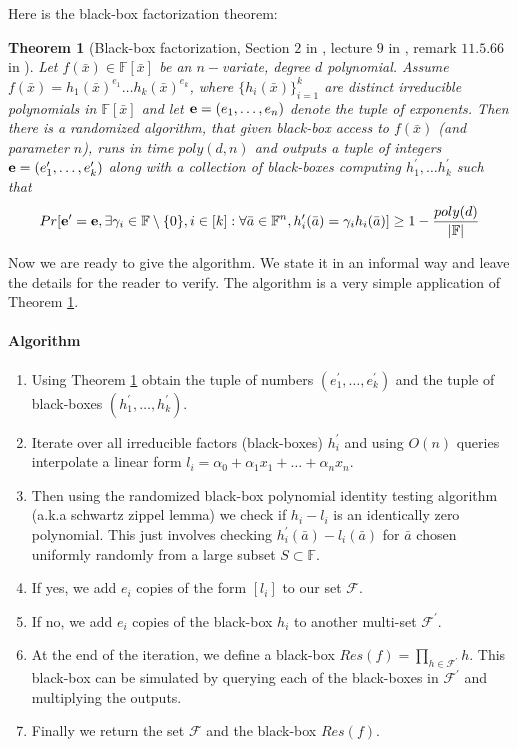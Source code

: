 \documentclass[12pt]{caltech_thesis}
\theoremstyle{plain}
\newtheorem{theorem}{Theorem}
\theoremstyle{definition}
\renewcommand{\bf}{\textbf}
\newcommand{\F}{\mathbb{F}}
\newcommand{\MF}{\mathcal{F}}
\newcommand{\B}[1]{\bar{#1}}
\begin{document}
Here is the black-box factorization theorem:


\begin{theorem}[Black-box factorization, Section $2$ in \cite{KalTr90}, lecture $9$ in \cite{Sud98}, remark $11.5.66$ in \cite{MulPa13}]\label{theorem:blackboxfactors}
 Let $f(\B{x})\in \F[\B{x}]$ be an $n-$variate, degree $d$ polynomial. Assume $f(\B{x}) = h_1(\B{x})^{e_1}\ldots h_k(\B{x})^{e_k}$,
 where $\{h_i(\B{x})\}_{i=1}^k$ are distinct irreducible polynomials in $\F[\B{x}]$ and let ${\bf e} = (e_1,\ldots,e_n)$ denote the tuple of exponents.
 Then there is a randomized algorithm, that given black-box access to $f(\B{x})$ (and parameter $n$), runs in
 time $poly(d,n)$ and outputs a tuple of integers ${\bf e }=(e_1^\prime,\ldots,e_k^\prime)$ along with a collection
 of black-boxes computing $h_1^\prime,\ldots h_k^\prime$ such that
 \[
  Pr[ {\bf e^\prime} = {\bf e }, \exists \gamma_i\in \F\setminus \{0\}, i\in [k]: \forall \B{a}\in \F^n, h_i^\prime(\B{a})= \gamma_i h_i(\B{a}) ]\geq 1-\frac{poly(d)}{|\F|}
 \]

\end{theorem}

Now we are ready to give the algorithm. We state it in an informal way and leave the details for the reader to verify. The algorithm is a very
simple application of Theorem \ref{theorem:blackboxfactors}.

\paragraph{Algorithm} \label{algorithm:blackboxfactors}
\begin{enumerate}
 \item Using Theorem \ref{theorem:blackboxfactors} obtain the tuple of numbers $(e_1^\prime,\ldots,e_k^\prime)$ and the tuple of
 black-boxes $(h_1^\prime,\ldots , h_k^\prime)$.
 \item Iterate over all irreducible factors (black-boxes) $h_i^\prime$ and using $O(n)$ queries interpolate a linear form 
 $l_i = \alpha_0 + \alpha_1x_1 + \ldots + \alpha_n x_n$.
 \item Then using the randomized black-box polynomial identity testing algorithm (a.k.a schwartz zippel lemma) we check if
$h_i-l_i$ is an identically zero polynomial. This just involves checking $h_i^\prime(\B{a}) - l_i(\B{a})$ for $\B{a}$
chosen uniformly randomly from a large subset $S\subset \F$.
\item If yes, we add $e_i$ copies of the form $[l_i]$ to our set $\MF$.
\item  If no, we add $e_i$ copies of the black-box 
$h_i$ to another multi-set $\MF^\prime$.
\item  At the end of the iteration, we define a black-box $Res(f) = \prod\limits_{h\in \MF^\prime}h$.
This black-box can be simulated by querying each of the black-boxes in $\MF^\prime$ and multiplying the outputs.
\item Finally we return the set $\MF$ and the black-box $Res(f)$.
\end{enumerate}
\end{document}
